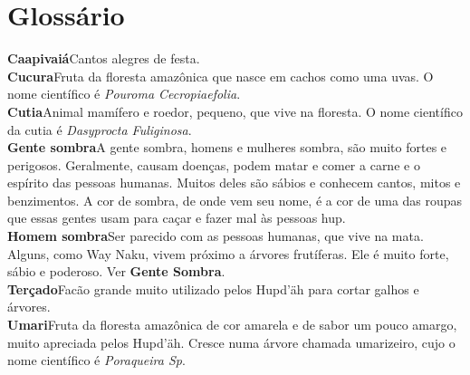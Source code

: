 \blankpage
\chapter{Glossário}


\textbf{Caapivaiá}\quad Cantos alegres de festa.\\
\textbf{Cucura}\quad Fruta da floresta amazônica que nasce em cachos
como uma uvas. O nome científico é \textit{Pouroma Cecropiaefolia}.\\
\textbf{Cutia}\quad Animal mamífero e roedor, pequeno, que vive na floresta. O nome
científico da cutia é \textit{Dasyprocta Fuliginosa}.\\
\textbf{Gente sombra}\quad A gente sombra, homens e mulheres sombra, são
muito fortes e perigosos. Geralmente, causam doenças, podem matar
e comer a carne e o espírito das pessoas humanas. Muitos deles
são sábios e conhecem cantos, mitos e benzimentos. A cor de
sombra, de onde vem seu nome, é a cor de uma das roupas que essas gentes
usam para caçar e fazer mal às pessoas hup.\\
\textbf{Homem sombra}\quad Ser parecido com as pessoas
humanas, que vive na mata. Alguns, como Way Naku, vivem próximo a árvores frutíferas. Ele
é muito forte, sábio e poderoso. Ver \textbf{Gente­ Sombra}.\\
\textbf{Terçado}\quad Facão grande muito utilizado pelos Hupd’äh para cortar
galhos e árvores.\\
\textbf{Umari}\quad Fruta da floresta amazônica de cor
amarela e de sabor um pouco amargo, muito apreciada pelos Hupd’äh.
Cresce numa árvore chamada umarizeiro, cujo o nome científico é \textit{Poraqueira Sp}.


